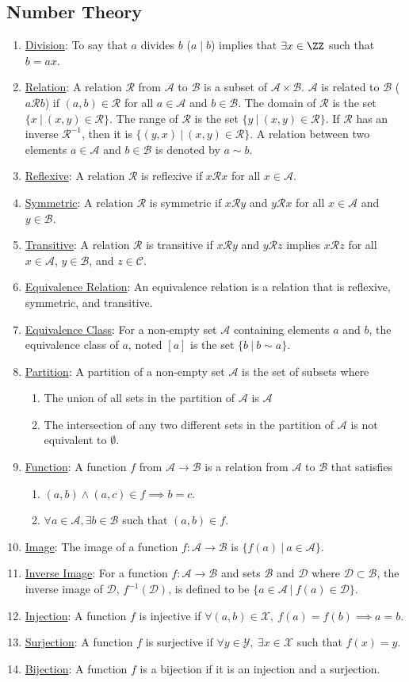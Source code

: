 \documentclass{hw}
\newcommand{\Define}[1]{\item\underline{#1}:}
\newcommand{\set}[1]{\mathcal{#1}}
\newcommand{\setA}{\mathcal{A}}
\newcommand{\setB}{\mathcal{B}}
\begin{document}
\subsection{Number Theory}
\begin{enumerate}
\Define{Division} To say that $a$ divides $b$ ($a\mid b$) implies that $\exists x\in\ZZ$ such that $b=ax$.
\Define{Relation} A relation $\mathcal{R}$ from $\setA$ to $\setB$ is a subset of $\setA\times\setB$.
$\setA$ is related to $\setB$ ($a\mathcal{R}b$) if $(a,b)\in\mathcal{R}$ for all $a\in\setA$ and
$b\in\setB$. The domain of $\mathcal{R}$ is the set $\{x\ |\ (x,y)\in\mathcal{R}\}$. The range of
$\mathcal{R}$ is the set $\{y\ |\ (x,y)\in\mathcal{R}\}$. If $\mathcal{R}$ has an inverse
$\mathcal{R}^{-1}$, then it is $\{(y,x)\ |\ (x,y)\in\mathcal{R}\}$. A relation between two elements
$a\in\setA$ and $b\in\setB$ is denoted by $a\sim b$.
\Define{Reflexive} A relation $\mathcal{R}$ is reflexive if $x\mathcal{R}x$ for all $x\in\setA$.
\Define{Symmetric} A relation $\mathcal{R}$ is symmetric if $x\mathcal{R}y$ and $y\mathcal{R}x$ for all
$x\in\setA$ and $y\in\setB$.
\Define{Transitive} A relation $\mathcal{R}$ is transitive if $x\mathcal{R}y$ and $y\mathcal{R}z$ implies
$x\mathcal{R}z$ for all $x\in\setA$, $y\in\setB$, and $z\in\set{C}$.
\Define{Equivalence Relation} An equivalence relation is a relation that is reflexive, symmetric, and
transitive.
\Define{Equivalence Class} For a non-empty set $\setA$ containing elements $a$ and $b$, the equivalence
class of $a$, noted $[a]$ is the set $\{b\ |\ b\sim a\}$.
\Define{Partition} A partition of a non-empty set $\setA$ is the set of subsets where
\begin{enumerate}
\item The union of all sets in the partition of $\setA$ is $\setA$
\item The intersection of any two different sets in the partition of $\setA$ is not equivalent to
$\emptyset$.
\end{enumerate}
\Define{Function} A function $f$ from $\setA\to\setB$ is a relation from $\setA$ to $\setB$ that satisfies
\begin{enumerate}
\item $(a,b)\wedge(a,c)\in f\implies b=c$.
\item $\forall a\in\setA, \exists b\in\setB$ such that $(a,b)\in f$.
\end{enumerate}
\Define{Image} The image of a function $f:\setA\to\setB$ is $\{f(a)\ |\ a\in\setA\}$.
\Define{Inverse Image} For a function $f:\setA\to\setB$ and sets $\setB$ and $\set{D}$ where
$\set{D}\subset\setB$, the inverse image of $\set{D}$, $f^{-1}(\set{D})$, is defined to be
$\{a\in\setA\ |\ f(a)\in\set{D}\}$.
\Define{Injection} A function $f$ is injective if $\forall (a,b)\in\set{X},\ f(a)=f(b)\implies a=b$.
\Define{Surjection} A function $f$ is surjective if $\forall y\in\set{Y},\ \exists x\in\set{X}$ such that
$f(x)=y$.
\Define{Bijection} A function $f$ is a bijection if it is an injection and a surjection.
\end{enumerate}
\end{document}
